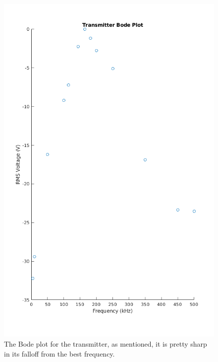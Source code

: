 \documentclass[10pt]{article}
\begin{document}
 \begin{center}
	\begin{figure}[H]
		\centering
		\includegraphics[scale = 0.35]{images/transmitterbode.png}
		\caption{The Bode plot for the transmitter, as mentioned, it is pretty sharp in its falloff from the best frequency.}
		\label{fig:transmitterbode}
	\end{figure}
\end{center}
\end{document}
